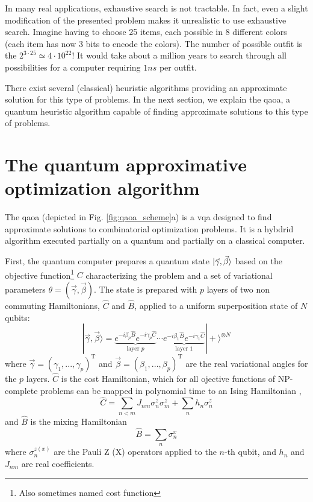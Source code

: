 In many real applications, exhaustive search is not tractable. In fact, even a slight modification of the presented problem makes it unrealistic to use exhaustive search. Imagine having to choose 25 items, each possible in 8 different colors (each item has now 3 bits to encode the colors). The number of possible outfit is the $2^{3 \cdot 25} \simeq 4\cdot 10^{22}$! It would take about a million years to search through all possibilities for a computer requiring $1\unit{ns}$ per outfit.

There exist several (classical) heuristic algorithms providing an approximate solution for this type of problems. In the next section, we explain the \gls{qaoa}, a quantum heuristic algorithm capable of finding approximate solutions to this type of problems.

\section{The quantum approximative optimization algorithm}\label{sec:qaoa}
The \gls{qaoa} \cite{Farhi2014AAlgorithm} (depicted in Fig. \ref{fig:qaoa_scheme}a) is a \gls{vqa} designed to find approximate solutions to combinatorial optimization problems. It is a hybdrid algorithm executed partially on a quantum and partially on a classical computer. 

First, the quantum computer prepares a quantum state $\ket{\vec{\gamma}, \vec{\beta}}$ based on the objective function\footnote{Also sometimes named cost function} $C$ characterizing the problem and a set of variational parameters $\theta = (\vec \gamma, \vec \beta)$. The state is prepared with $p$ layers of two non commuting Hamiltonians, $\hat C$ and $\hat B$, applied to a uniform superposition state of $N$ qubits:
\begin{equation}
    |\vec{\gamma}, \vec{\beta}\rangle=\underbrace{e^{-i \beta_{p} \hat B} e^{-i \gamma_{p} \hat C}}_{\text {layer } p} \cdots \underbrace{e^{-i \beta_{1} \hat B} e^{-i \gamma_{1} \hat C}}_{\text {layer } 1}|+\rangle^{\otimes N}
\end{equation}
where $\vec\gamma = (\gamma_1, ..., \gamma_p)^\text{T}$ and $\vec\beta = (\beta_1, ... , \beta_p)^\text{T}$ are the real variational angles for the $p$ layers. $\hat C$ is the cost Hamiltonian, which for all ojective functions of NP-complete problems can be mapped in polynomial time to an Ising Hamiltonian \cite{Lucas2014IsingProblems},
\begin{equation}
    \hat C =\sum_{n < m} J_{n m} \sigma_{n}^z \sigma_{m}^z + \sum_{n} h_n \sigma_{n}^z
\end{equation}
and $\hat B$ is the mixing Hamiltonian 
\begin{equation}
    \hat B = \sum_{n} \sigma_n^x
\end{equation}
where $\sigma_n^{z (x)}$ are the Pauli Z (X) operators applied to the $n$-th qubit, and $h_n$ and $J_{n m}$ are real coefficients.

